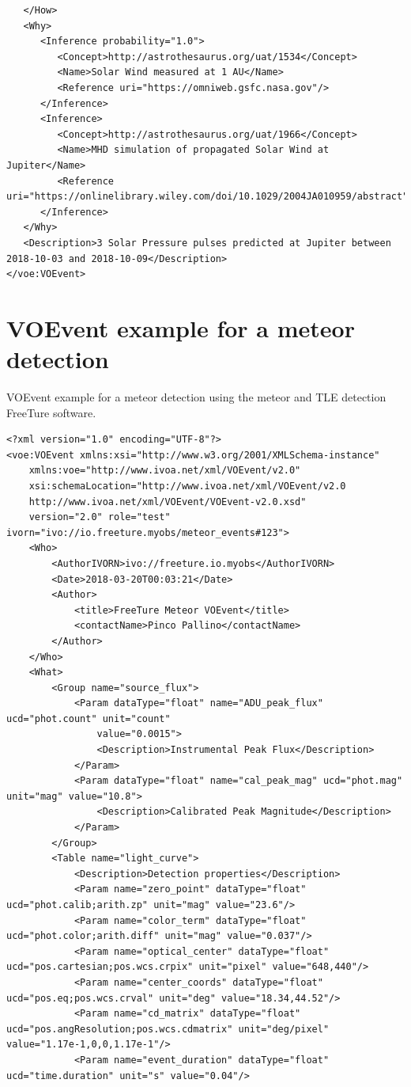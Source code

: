 \documentclass[referee,a4paper,12pt,traditabstract]{swsc}
\begin{document}
\begin{linenumbers}
{\begin{verbatim}
   </How>
   <Why>
      <Inference probability="1.0">
         <Concept>http://astrothesaurus.org/uat/1534</Concept>
         <Name>Solar Wind measured at 1 AU</Name>
         <Reference uri="https://omniweb.gsfc.nasa.gov"/>
      </Inference>
      <Inference>
         <Concept>http://astrothesaurus.org/uat/1966</Concept>
         <Name>MHD simulation of propagated Solar Wind at Jupiter</Name>
         <Reference uri="https://onlinelibrary.wiley.com/doi/10.1029/2004JA010959/abstract"/>
      </Inference>
   </Why>
   <Description>3 Solar Pressure pulses predicted at Jupiter between 2018-10-03 and 2018-10-09</Description>
</voe:VOEvent>
\end{verbatim}
}

\section{VOEvent example for a meteor detection}
\label{appendix-xml-voevent-tle}
VOEvent example for a meteor detection using the meteor and TLE detection FreeTure \cite{2014pim4.conf...39A} software.

{\tiny 
\begin{verbatim}
<?xml version="1.0" encoding="UTF-8"?>
<voe:VOEvent xmlns:xsi="http://www.w3.org/2001/XMLSchema-instance"
    xmlns:voe="http://www.ivoa.net/xml/VOEvent/v2.0"
    xsi:schemaLocation="http://www.ivoa.net/xml/VOEvent/v2.0
    http://www.ivoa.net/xml/VOEvent/VOEvent-v2.0.xsd"
    version="2.0" role="test" ivorn="ivo://io.freeture.myobs/meteor_events#123">
    <Who>
        <AuthorIVORN>ivo://freeture.io.myobs</AuthorIVORN>
        <Date>2018-03-20T00:03:21</Date>
        <Author>
            <title>FreeTure Meteor VOEvent</title>
            <contactName>Pinco Pallino</contactName>
        </Author>
    </Who>
    <What>
        <Group name="source_flux">
            <Param dataType="float" name="ADU_peak_flux" ucd="phot.count" unit="count"
                value="0.0015">
                <Description>Instrumental Peak Flux</Description>
            </Param>
            <Param dataType="float" name="cal_peak_mag" ucd="phot.mag" unit="mag" value="10.8">
                <Description>Calibrated Peak Magnitude</Description>
            </Param>
        </Group>
        <Table name="light_curve">
            <Description>Detection properties</Description>
            <Param name="zero_point" dataType="float" ucd="phot.calib;arith.zp" unit="mag" value="23.6"/>
            <Param name="color_term" dataType="float" ucd="phot.color;arith.diff" unit="mag" value="0.037"/>
            <Param name="optical_center" dataType="float" ucd="pos.cartesian;pos.wcs.crpix" unit="pixel" value="648,440"/>
            <Param name="center_coords" dataType="float" ucd="pos.eq;pos.wcs.crval" unit="deg" value="18.34,44.52"/>
            <Param name="cd_matrix" dataType="float" ucd="pos.angResolution;pos.wcs.cdmatrix" unit="deg/pixel" value="1.17e-1,0,0,1.17e-1"/>
            <Param name="event_duration" dataType="float" ucd="time.duration" unit="s" value="0.04"/>


\end{verbatim}}
\end{linenumbers}
\end{document}
